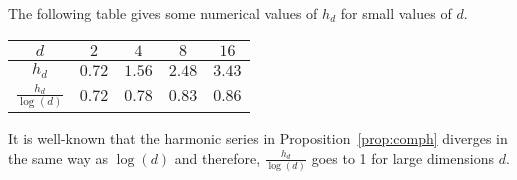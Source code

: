 

The following table gives some numerical values of $h_d$ for small
values of $d$.
\begin{center}
\begin{tabular}{c|cccc}
  $d$                    & $2$    & $4$    & $8$    & $16$ \\
  \hline
  $h_d$                  & $0.72$ & $1.56$ & $2.48$ & $3.43$ \\
  $\frac{h_d}{\log(d)}$ & $0.72$ & $0.78$ & $0.83$ & $0.86$ 
\end{tabular}
\end{center}

It is well-known that the harmonic series in
Proposition~\ref{prop:comph} diverges in the same way as $\log(d)$
and therefore, $\frac{h_d}{\log(d)}$ goes to 1 for large dimensions
$d$.





